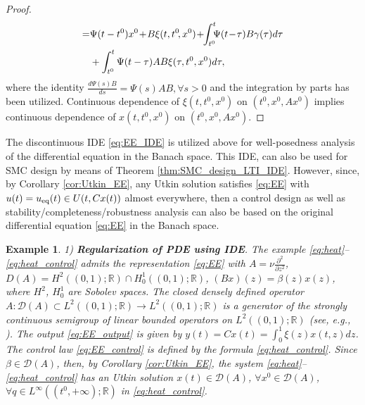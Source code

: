 \documentclass{article}
\newcommand{\R}{\mathbb{R}}
\newcommand{\D}{\mathcal{D}}
\newtheorem{example}{Example}
\begin{document}
{\begin{proof}
\[\begin{split}
 		=&\Psi(t-t^0)x^0\!+\!B\xi(t,t^0\!,x^0)\!+\!\!\int^t_{t^0}\!\!\!\Psi(t\!-\!\tau) B\gamma(\tau)d\tau\\
 		&+\int^t_{t^0}\Psi(t-\tau) AB \xi(\tau,t^0,x^0)d\tau,
 		\end{split}\vspace{-1mm}
 		\]
 		where the identity $\frac{d\Psi(s)B}{ds}=\Psi(s)AB,\forall s> 0$ and the integration by parts has been utilized.
 	Continuous dependence of $\xi(t,t^0,x^0)$ on $(t^0,x^0,Ax^0)$ implies continuous dependence of $x(t,t^0,x^0)$ on $(t^0,x^0,Ax^0)$.
 	\end{proof}
The discontinuous IDE \eqref{eq:EE_IDE} is utilized  above for  well-posedness analysis of the differential equation in the Banach space.  This IDE, can also  be used for SMC design by means of  Theorem \ref{thm:SMC_design_LTI_IDE}. However,  since, by Corollary \ref{cor:Utkin_EE}, any Utkin solution satisfies \eqref{eq:EE} with $u(t)=u_{\rm eq}(t)\in U(t,Cx(t))$ almost everywhere, then a control design as well as stability/completeness/robustness analysis can also be based on the original differential equation \eqref{eq:EE} in the Banach space. 
 \begin{example}\itshape\label{ex:8}
 1) \textbf{Regularization of PDE using IDE}.	 The example \eqref{eq:heat}--\eqref{eq:heat_control}  admits the representation \eqref{eq:EE} with 
 $A\!=\!\nu\frac{\partial^2}{\partial z^2}$, $D(A)\!=\!H^2((0,1);\R)\cap H^1_0((0,1);\R)$, $(Bx)(z)\!=\!\beta(z) x(z)$, where $H^2$, $H^1_0$ are Sobolev spaces. 
 The closed densely defined operator $A: \D(A)\subset L^2((0,1);\R)\to L^2((0,1);\R)$ is a generator of the strongly continuous semigroup of linear bounded operators on $L^2((0,1);\R)$ (see, e.g., \cite[page 212]{Pazy1983:Book}).
The output \eqref{eq:EE_output} is given by $y(t)=Cx(t)=\int^1_0\xi(z)x(t,z)dz$. The control law \eqref{eq:EE_control}  is defined by the formula  \eqref{eq:heat_control}.  Since $\beta\in \D(A)$, then, by Corollary \ref{cor:Utkin_EE}, the system  \eqref{eq:heat}--\eqref{eq:heat_control}  has an Utkin solution $x(t)\!\in\! \D(A)$, $\forall x^0\in \D(A)$, $\forall  
 q\!\in\! L^{\infty}((t^0,+\infty);\R)$ in \eqref{eq:heat_control}.
 

\end{example}}
\end{document}
